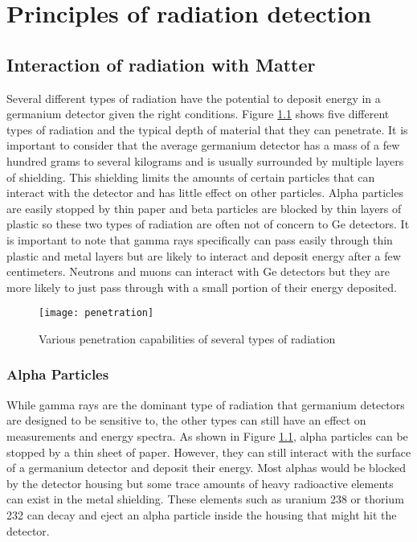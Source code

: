 \chapter{Principles of radiation detection}

\section{Interaction of radiation with Matter}
Several different types of radiation have the potential to deposit energy in a germanium detector given the right conditions.
Figure \ref{fig:penetration} shows five different types of radiation and the typical depth of material that they can penetrate.
It is important to consider that the average germanium detector has a mass of a few hundred grams to several kilograms and is usually surrounded by multiple layers of shielding.
This shielding limits the amounts of certain particles that can interact with the detector and has little effect on other particles.
Alpha particles are easily stopped by thin paper and beta particles are blocked by thin layers of plastic so these two types of radiation are often not of concern to Ge detectors.
It is important to note that gamma rays specifically can pass easily through thin plastic and metal layers but are likely to interact and deposit energy after a few centimeters.
Neutrons and muons can interact with Ge detectors but they are more likely to just pass through with a small portion of their energy deposited.
\begin{figure}[htpb]
\centering
\texttt{[image: penetration]}
\caption{Various penetration capabilities of several types of radiation}
\label{fig:penetration}
\end{figure}

\subsection{Alpha Particles}
While gamma rays are the dominant type of radiation that germanium detectors are designed to be sensitive to, the other types can still have an effect on measurements and energy spectra.
As shown in Figure \ref{fig:penetration}, alpha particles can be stopped by a thin sheet of paper.
However, they can still interact with the surface of a germanium detector and deposit their energy.
Most alphas would be blocked by the detector housing but some trace amounts of heavy radioactive elements can exist in the metal shielding.
These elements such as uranium 238 or thorium 232 can decay and eject an alpha particle inside the housing that might hit the detector.

